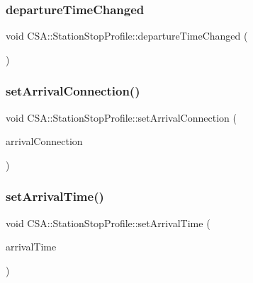 \subsubsection{\texorpdfstring{departure\+Time\+Changed}{departureTimeChanged}}
{\footnotesize\ttfamily void C\+S\+A\+::\+Station\+Stop\+Profile\+::departure\+Time\+Changed (\begin{DoxyParamCaption}{ }\end{DoxyParamCaption})\hspace{0.3cm}{\ttfamily [signal]}}

\mbox{\label{classCSA_1_1StationStopProfile_aaf7ff4817f02d371363fd7d9cb3981cc}} 
\subsubsection{\texorpdfstring{set\+Arrival\+Connection()}{setArrivalConnection()}}
{\footnotesize\ttfamily void C\+S\+A\+::\+Station\+Stop\+Profile\+::set\+Arrival\+Connection (\begin{DoxyParamCaption}\item[{\mbox{\hyperlink{classFragments_1_1Fragment}{Fragments\+::\+Fragment}} $\ast$}]{arrival\+Connection }\end{DoxyParamCaption})}

\mbox{\label{classCSA_1_1StationStopProfile_ac6690454adee23fde8d7ff5abd42396d}} 
\subsubsection{\texorpdfstring{set\+Arrival\+Time()}{setArrivalTime()}}
{\footnotesize\ttfamily void C\+S\+A\+::\+Station\+Stop\+Profile\+::set\+Arrival\+Time (\begin{DoxyParamCaption}\item[{const Q\+Date\+Time \&}]{arrival\+Time }\end{DoxyParamCaption})}

